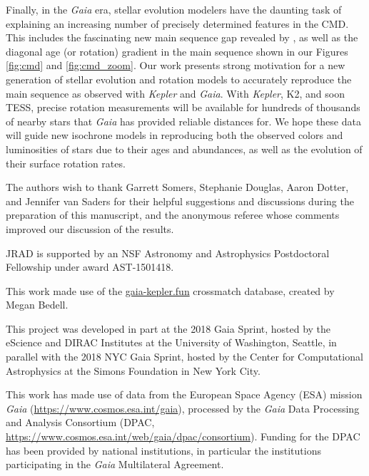 \documentclass[trackchanges,preprint2]{aastex62}
\newcommand{\Kepler}{\textsl{Kepler}\xspace}
\begin{document}
Finally, in the {\em Gaia} era, stellar evolution modelers have the daunting task of explaining an increasing number of precisely determined features in the CMD. This includes the fascinating new main sequence gap revealed by \citet{jao2018}, as well as the diagonal age (or rotation) gradient in the main sequence shown in our Figures \ref{fig:cmd} and \ref{fig:cmd_zoom}. Our work presents strong motivation for a new generation of stellar evolution and rotation models to accurately reproduce the main sequence as observed with \Kepler and {\em Gaia}. With \Kepler, K2, and soon TESS, precise rotation measurements will be available for hundreds of thousands of nearby stars that {\em Gaia} has provided reliable distances for. We hope these data will guide new isochrone models in reproducing both the observed colors and luminosities of stars due to their ages and abundances, as well as the evolution of their surface rotation rates. 


\acknowledgments
The authors wish to thank Garrett Somers, Stephanie Douglas, Aaron Dotter, and Jennifer van Saders for their helpful suggestions and discussions during the preparation of this manuscript, and the anonymous referee whose comments improved our discussion of the results.

JRAD is supported by an NSF Astronomy and Astrophysics Postdoctoral Fellowship under award AST-1501418. 

This work made use of the \url{gaia-kepler.fun} crossmatch database, created by Megan Bedell.

This project was developed in part at the 2018 Gaia Sprint, hosted by the eScience and DIRAC Institutes at the University of Washington, Seattle, in parallel with the 2018 NYC Gaia Sprint, hosted by the Center for Computational Astrophysics at the Simons Foundation in New York City.

This work has made use of data from the European Space Agency (ESA) mission
{\it Gaia} (\url{https://www.cosmos.esa.int/gaia}), processed by the {\it Gaia}
Data Processing and Analysis Consortium (DPAC,
\url{https://www.cosmos.esa.int/web/gaia/dpac/consortium}). Funding for the DPAC
has been provided by national institutions, in particular the institutions
participating in the {\it Gaia} Multilateral Agreement.






\end{document}
